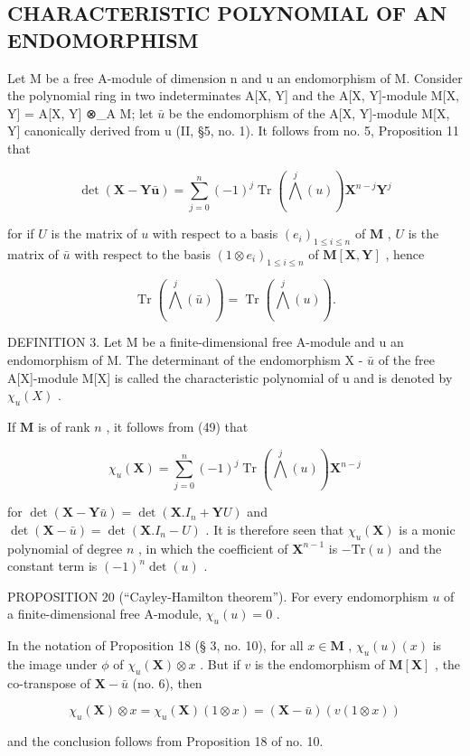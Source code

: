 \subsection{CHARACTERISTIC POLYNOMIAL OF AN ENDOMORPHISM}

Let M be a free A-module of dimension n and u an endomorphism of M. Consider the polynomial ring in two indeterminates A{[}X, Y{]} and the A{[}X, Y{]}-module M{[}X, Y{]} = A{[}X, Y{]} ⊗\_A M; let \(\bar{u}\) be the endomorphism of the A{[}X, Y{]}-module M{[}X, Y{]} canonically derived from u (II, §5, no. 1). It follows from no. 5, Proposition 11 that

\[
\det (\mathbf {X} - \mathbf {Y} \bar {\boldsymbol {u}}) = \sum_ {j = 0} ^ {n} (- 1) ^ {j} \operatorname{Tr} \left(\bigwedge^ {j} (u)\right) \mathbf {X} ^ {n - j} \mathbf {Y} ^ {j}\tag{49}
\]

for if \(U\) is the matrix of \(u\) with respect to a basis \((e_i)_{1 \leqslant i \leqslant n}\) of \(\mathbf{M}\) , \(U\) is the matrix of \(\bar{u}\) with respect to the basis \((1 \otimes e_i)_{1 \leqslant i \leqslant n}\) of \(\mathbf{M}[\mathbf{X}, \mathbf{Y}]\) , hence

\[
\operatorname{Tr} \left(\bigwedge^ {j} (\bar {u})\right) = \operatorname{Tr} \left(\bigwedge^ {j} (u)\right).
\]

DEFINITION 3. Let M be a finite-dimensional free A-module and u an endomorphism of M. The determinant of the endomorphism X - \(\bar{u}\) of the free A{[}X{]}-module M{[}X{]} is called the characteristic polynomial of u and is denoted by \(\chi_u(X)\) .

If \(\mathbf{M}\) is of rank \(n\) , it follows from (49) that

\[
\chi_ {u} (\mathbf {X}) = \sum_ {j = 0} ^ {n} (- 1) ^ {j} \operatorname{Tr} \left(\bigwedge^ {j} (u)\right) \mathbf {X} ^ {n - j}\tag{50}
\]

for \(\operatorname{det}(\mathbf{X} - \mathbf{Y}\bar{u}) = \operatorname{det}(\mathbf{X}.I_n + \mathbf{Y}U)\) and \(\operatorname{det}(\mathbf{X} - \bar{u}) = \operatorname{det}(\mathbf{X}.I_n - U)\) . It is therefore seen that \(\chi_u(\mathbf{X})\) is a monic polynomial of degree \(n\) , in which the coefficient of \(\mathbf{X}^{n-1}\) is \(-\mathrm{Tr}(u)\) and the constant term is \((-1)^n \operatorname{det}(u)\) .

PROPOSITION 20 (``Cayley-Hamilton theorem''). For every endomorphism \(u\) of a finite-dimensional free A-module, \(\chi_u(u) = 0\) .

In the notation of Proposition 18 (§ 3, no. 10), for all \(x \in \mathbf{M}\) , \(\chi_u(u)(x)\) is the image under \(\phi\) of \(\chi_u(\mathbf{X}) \otimes x\) . But if \(v\) is the endomorphism of \(\mathbf{M}[\mathbf{X}]\) , the co-transpose of \(\mathbf{X} - \bar{u}\) (no. 6), then

\[
\chi_ {u} (\mathbf {X}) \otimes x = \chi_ {u} (\mathbf {X}) (1 \otimes x) = (\mathbf {X} - \bar {u}) (v (1 \otimes x))
\]

and the conclusion follows from Proposition 18 of no. 10.


